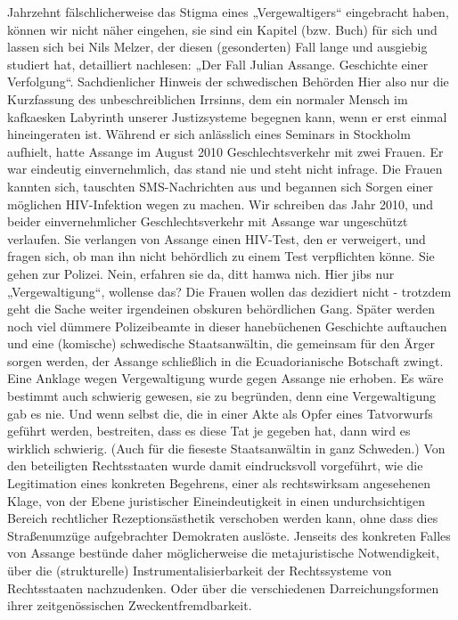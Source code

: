 \begin{multicols}{2}
Jahrzehnt fälschlicherweise das Stigma eines „Vergewaltigers“ eingebracht haben, können wir nicht näher
eingehen, sie sind ein Kapitel (bzw. Buch) für sich und
lassen sich bei Nils Melzer, der diesen (gesonderten) Fall
lange und ausgiebig studiert hat, detailliert nachlesen:
„Der Fall Julian Assange. Geschichte einer Verfolgung“.
Sachdienlicher Hinweis der schwedischen Behörden
Hier also nur die Kurzfassung des unbeschreiblichen Irrsinns, dem ein normaler Mensch im kafkaesken Labyrinth unserer Justizsysteme begegnen kann, wenn er erst
einmal hineingeraten ist. Während er sich anlässlich
eines Seminars in Stockholm aufhielt, hatte Assange im
August 2010 Geschlechtsverkehr mit zwei Frauen. Er war
eindeutig einvernehmlich, das stand nie und steht nicht
infrage. Die Frauen kannten sich, tauschten SMS-Nachrichten aus und begannen sich Sorgen einer möglichen
HIV-Infektion wegen zu machen. Wir schreiben das Jahr
2010, und beider einvernehmlicher Geschlechtsverkehr
mit Assange war ungeschützt verlaufen. Sie verlangen
von Assange einen HIV-Test, den er verweigert, und fragen
sich, ob man ihn nicht behördlich zu einem Test verpflichten könne. Sie gehen zur Polizei. Nein, erfahren sie da, ditt
hamwa nich. Hier jibs nur „Vergewaltigung“, wollense
das? Die Frauen wollen das dezidiert nicht - trotzdem
geht die Sache weiter irgendeinen obskuren behördlichen
Gang. Später werden noch viel dümmere Polizeibeamte
in dieser hanebüchenen Geschichte auftauchen und eine
(komische) schwedische Staatsanwältin, die gemeinsam
für den Ärger sorgen werden, der Assange schließlich in
die Ecuadorianische Botschaft zwingt. Eine Anklage wegen Vergewaltigung wurde gegen Assange nie erhoben. Es
wäre bestimmt auch schwierig gewesen, sie zu begründen,
denn eine Vergewaltigung gab es nie. Und wenn selbst die,
die in einer Akte als Opfer eines Tatvorwurfs geführt werden, bestreiten, dass es diese Tat je gegeben hat, dann wird
es wirklich schwierig. (Auch für die fieseste Staatsanwältin in ganz Schweden.)
Von den beteiligten Rechtsstaaten wurde damit eindrucksvoll vorgeführt, wie die Legitimation eines konkreten Begehrens, einer als rechtswirksam angesehenen
Klage, von der Ebene juristischer Eineindeutigkeit in
einen undurchsichtigen Bereich rechtlicher Rezeptionsästhetik verschoben werden kann, ohne dass dies Straßenumzüge aufgebrachter Demokraten auslöste.
Jenseits des konkreten Falles von Assange bestünde
daher möglicherweise die metajuristische Notwendigkeit, über die (strukturelle) Instrumentalisierbarkeit der
Rechtssysteme von Rechtsstaaten nachzudenken. Oder
über die verschiedenen Darreichungsformen ihrer zeitgenössischen Zweckentfremdbarkeit.


\end{multicols}
